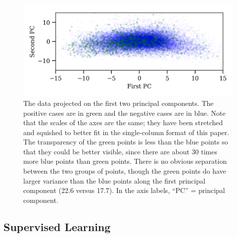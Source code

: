 \begin{figure}
\begin{centering}
\includegraphics[width=5in]{pca.png}
\caption{\label{pca} The data projected on the first two principal components.  The positive cases are in green and the negative cases are in blue.  Note that the scales of the axes are the same; they have been stretched and squished to better fit in the single-column format of this paper.  The transparency of the green points is less than the blue points so that they could be better visible, since there are about 30 times more blue points than green points.  There is no obvious separation between the two groups of points, though the green points do have larger variance than the blue points along the first principal component (22.6 versus 17.7).  In the axis labels, ``PC'' = principal component.}
\end{centering}
\end{figure}







\subsection{Supervised Learning}